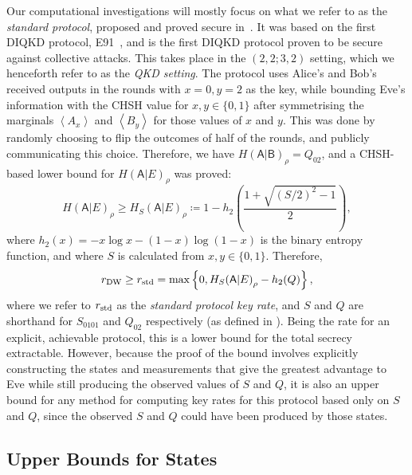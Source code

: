 \documentclass[10pt, a4paper]{article}
\numberwithin{equation}{section} %
\theoremstyle{definition}
\theoremstyle{plain}
\newcommand{\?}{\mathrel{?}} %
\newcommand{\angleb}[1]{\left\langle #1 \right\rangle} %
\newcommand{\crv}[1]{\mathsf{#1}}
\newcommand{\DW}{\rm DW}
\newcommand{\std}{\rm std}
\begin{document}
    Our computational investigations will mostly focus on what we refer to as the \emph{standard protocol}, proposed and proved secure in~\cite{DIQKD_Lower}. It was based on the first DIQKD protocol, E91~\cite{E91}, and is the first DIQKD protocol proven to be secure against collective attacks. This takes place in the \((2,2;3,2)\) setting, which we henceforth refer to as the \emph{QKD setting}. The protocol uses Alice's and Bob's received outputs in the rounds with \(x = 0, y = 2\) as the key, while bounding Eve's information with the CHSH value for \(x,y \in \{0,1\}\) after symmetrising the marginals \(\angleb{A_x}\) and \(\angleb{B_y}\) for those values of \(x\) and \(y\). This was done by randomly choosing to flip the outcomes of half of the rounds, and publicly communicating this choice. Therefore, we have \({H(\crv{A}|\crv{B})}_{\rho} = Q_{02}\), and a CHSH-based lower bound for \({H(\crv{A}|E)}_{\rho}\) was proved:
    \begin{equation}
      {H(\crv{A}|E)}_{\rho} \geq {H_S(\crv{A}|E)}_{\rho} \coloneqq 1 - h_2\left( \frac{1 + \sqrt{{(S/2)}^2-1}}{2} \right),
    \end{equation}
    where \(h_2(x) = - x \log x - (1-x) \log (1-x)\) is the binary entropy function, and where \(S\) is calculated from \(x,y \in \{0,1\}\). Therefore,
    \begin{equation}
      r_{\DW} \geq r_{\std} = \max \left\{ 0, {H_S(\crv{A}|E)}_{\rho} - h_2(Q) \right\},
    \end{equation}
    where we refer to \(r_{\std}\) as the \emph{standard protocol key rate}, and \(S\) and \(Q\) are shorthand for \(S_{0101}\) and \(Q_{02}\) respectively (as defined in ). Being the rate for an explicit, achievable protocol, this is a lower bound for the total secrecy extractable. However, because the proof of the bound involves explicitly constructing the states and measurements that give the greatest advantage to Eve while still producing the observed values of \(S\) and \(Q\), it is also an upper bound for any method for computing key rates for this protocol based only on \(S\) and \(Q\), since the observed \(S\) and \(Q\) could have been produced by those states.

    \subsection{Upper Bounds for States}\label{sec:diqkd_ustate}
\end{document}
